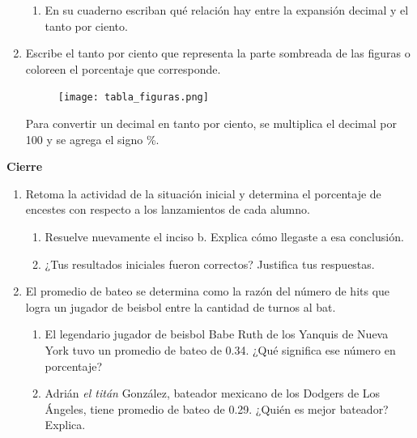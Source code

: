 \documentclass[11pt]{book}
\begin{document}
\begin{enumerate}
        \begin{enumerate}
          \item En su cuaderno escriban qué relación hay entre la expansión decimal y el tanto por
                ciento.
        \end{enumerate}
  \item Escribe el tanto por ciento que representa la parte sombreada de las
        figuras o coloreen el porcentaje que corresponde.
        \begin{figure}[H]
          \centering
          \texttt{[image: tabla\_figuras.png]}
          \label{fig:tabla_figuras}
        \end{figure}
        \begin{boxH}
          Para convertir un decimal en tanto por ciento, se multiplica el decimal por 100 y
          se agrega el signo \%.
        \end{boxH}
\end{enumerate}

\begin{boxK}
  \begin{center}\textbf{Cierre}\end{center}

  \begin{enumerate}
    \item Retoma la actividad de la situación inicial y determina el porcentaje de encestes
          con respecto a los lanzamientos de cada alumno.
          \begin{enumerate}
            \item Resuelve nuevamente el inciso b. Explica cómo llegaste a esa conclusión.
            \item ¿Tus resultados iniciales fueron correctos? Justifica tus respuestas.
          \end{enumerate}
    \item El promedio de bateo se determina como la razón del número de hits que logra
          un jugador de beisbol entre la cantidad de turnos al bat.\\
          \begin{enumerate}
            \item  El legendario jugador de beisbol Babe Ruth de los Yanquis de Nueva York tuvo
                  un promedio de bateo de 0.34. ¿Qué significa ese número en porcentaje?
            \item Adrián \emph{el titán} González, bateador mexicano de los Dodgers de Los Ángeles,
                  tiene promedio de bateo de 0.29. ¿Quién es mejor bateador? Explica.
          \end{enumerate}
  \end{enumerate}
\end{boxK}
\newpage
\end{document}
